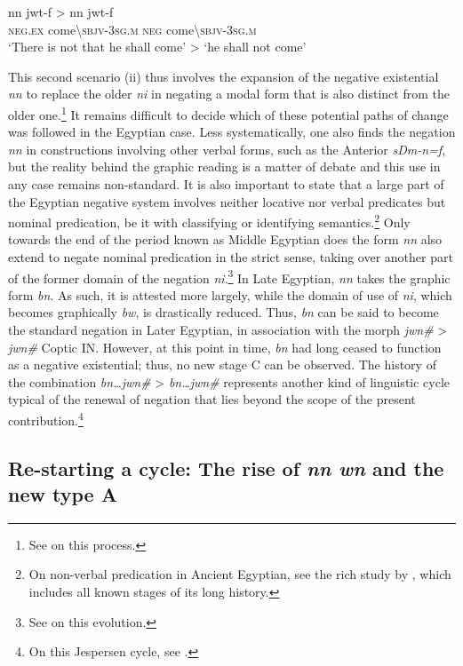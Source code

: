 \documentclass[output=paper]{langsci/langscibook}
\begin{document}
\ea \label{ex:AE36}
    \gll nn jwt-f > nn jwt-f \\
    \textsc{neg.ex} come\textbackslash\textsc{sbjv-3sg.m} { } \textsc{neg} come\textbackslash\textsc{sbjv-3sg.m} \\ 
    \glt ‘There is not that he shall come’ > ‘he shall not come’ 
\z
 
This second scenario (ii) thus involves the expansion of the negative existential \textit{nn} to replace the older \textit{ni} in negating a modal form that is also distinct from the older one.\footnote{See \citet{Vernus1990} on this process. } It remains difficult to decide which of these potential paths of change was followed in the Egyptian case.  
Less systematically, one also finds the negation \textit{nn} in constructions involving other verbal forms, such as the Anterior \textit{sDm-n=f}, but the reality behind the graphic reading is a matter of debate and this use in any case remains non-standard. It is also important to state that a large part of the Egyptian negative system involves neither locative nor verbal predicates but nominal predication, be it with classifying or identifying semantics.\footnote{On non-verbal predication in Ancient Egyptian, see the rich study by \citet{Loprieno-etal2017}, which includes all known stages of its long history. } 
Only towards the end of the period known as Middle Egyptian does the form \textit{nn} also extend to negate nominal predication in the strict sense, taking over another part of the former domain of the negation \textit{ni}.\footnote{See \citet{Uljas2013} on this evolution.} 
In Late Egyptian, \textit{nn} takes the graphic form \textit{bn}. As such, it is attested more largely, while the domain of use of \textit{ni}, which becomes graphically \textit{bw}, is drastically reduced. Thus, \textit{bn} can be said to become the standard negation in Later Egyptian, in association with the morph \textit{jwn\#} > \textit{jwn#} Coptic IN. However, at this point in time, \textit{bn} had long ceased to function as a negative existential; thus, no new stage C can be observed. The history of the combination \textit{bn…jwn\#} > \textit{bn…jwn\#} represents another kind of linguistic cycle typical of the renewal of negation that lies beyond the scope of the present contribution.\footnote{On this Jespersen cycle, see \citet{Winand1997}.}

\subsection{Re-starting a cycle: The rise of \textit{nn wn} and the new type A}\label{s:AE2-5}
\end{document}
